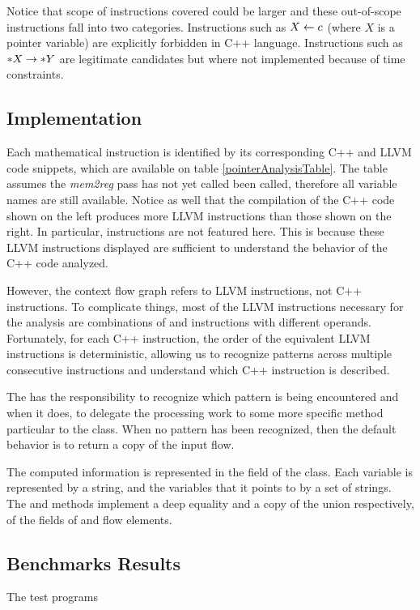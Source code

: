 Notice that scope of instructions covered could be larger and these out-of-scope instructions fall into two categories. Instructions such as $X \leftarrow c$ (where $X$ is a pointer variable) are explicitly forbidden in C++ language. Instructions such as $*X \rightarrow *Y$ are legitimate candidates but where not implemented because of time constraints. 
\subsection{Implementation}
Each mathematical instruction is identified by its corresponding C++ and LLVM code snippets, which are available on table \ref{pointerAnalysisTable}. The table assumes the \emph{mem2reg} pass has not yet called been called, therefore all variable names are still available. Notice as well that the compilation of the C++ code shown on the left produces more LLVM instructions than those shown on the right. In particular,  instructions are not featured here. This is because these LLVM instructions displayed are sufficient to understand the behavior of the C++ code analyzed.

However, the context flow graph refers to LLVM instructions, not C++ instructions. To complicate things, most of the LLVM instructions necessary for the analysis are combinations of  and  instructions with different operands. Fortunately, for each C++ instruction, the order of the equivalent LLVM instructions is deterministic, allowing us to recognize patterns across multiple consecutive instructions and understand which C++ instruction is described. 

The  has the responsibility to recognize which pattern is being encountered and when it does, to delegate the processing work to some more specific method particular to the  class.  
When no pattern has been recognized, then the default behavior is to return a copy of the input flow.

The computed information is represented in the  field of the  class. Each variable is represented by a string, and the variables that it points to by a set of strings. The  and  methods implement a deep equality and a copy of the union respectively, of the  fields of  and  flow elements.

\subsection*{Benchmarks Results}

The test programs


